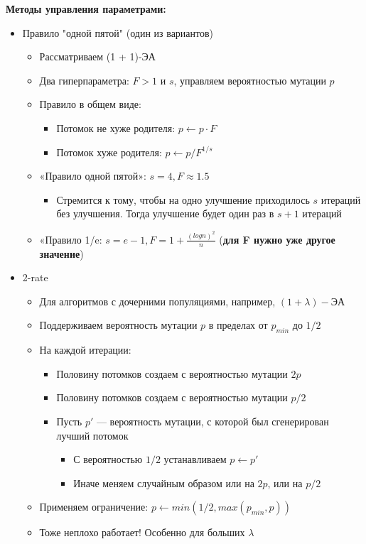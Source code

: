 \textbf{Методы управления параметрами:}
\begin{itemize}
    \item Правило "одной пятой" (один из вариантов)
    \begin{itemize}
        \item Рассматриваем (1 + 1)-ЭА
        \item Два гиперпараметра: $F > 1$ и $s$, управляем вероятностью мутации $p$
        \item Правило в общем виде:
        \begin{itemize}
            \item Потомок не хуже родителя: $p \leftarrow p · F$ 
            \item Потомок хуже родителя: $p \leftarrow p/F^{1/s}$
        \end{itemize}
        \item «Правило одной пятой»: $s= 4, F \approx 1.5$
        \begin{itemize}
            \item Стремится к тому, чтобы на одно улучшение приходилось $s$ итераций без улучшения. Тогда улучшение будет один раз в $s + 1$ итераций
        \end{itemize}
        \item «Правило 1/e: $s= e-1, F = 1 + \frac{(logn)^2}{n}$ (\textbf{для F нужно уже другое значение})
    \end{itemize}
    \item 2-rate
    \begin{itemize}
        \item Для алгоритмов с дочерними популяциями, например, $(1 + \lambda)-ЭА$
        \item Поддерживаем вероятность мутации $p$ в пределах от $p_{min}$ до $1/2$
        \item На каждой итерации:
        \begin{itemize}
            \item Половину потомков создаем с вероятностью мутации $2p$
            \item Половину потомков создаем с вероятностью мутации $p/2$
            \item Пусть $p'$ — вероятность мутации, с которой был сгенерирован лучший потомок
            \begin{itemize}
                \item С вероятностью $1/2$ устанавливаем $p \leftarrow p'$
                \item Иначе меняем случайным образом или на $2p$, или на $p/2$
            \end{itemize}
        \end{itemize}
        \item Применяем ограничение: $p \leftarrow min(1/2, max(p_{min}, p ))$
        \item Тоже неплохо работает! Особенно для больших $\lambda$    
    \end{itemize}
\end{itemize}


